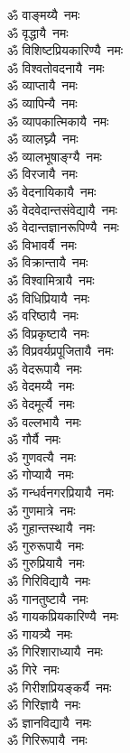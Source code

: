 \begin{flushleft}
\begin{multicols}{2}
ॐ वाङ्मय्यै~नमः\\
ॐ वृद्धायै~नमः\\
ॐ विशिष्टप्रियकारिण्यै~नमः\\
ॐ विश्वतोवदनायै~नमः\\
ॐ व्याप्तायै~नमः\\
ॐ व्यापिन्यै~नमः\\
ॐ व्यापकात्मिकायै~नमः\\
ॐ व्यालघ्न्यै~नमः\\
ॐ व्यालभूषाङ्ग्यै~नमः\\
ॐ विरजायै~नमः\hfill{}\\
ॐ वेदनायिकायै~नमः\\
ॐ वेदवेदान्तसंवेद्यायै~नमः\\
ॐ वेदान्तज्ञानरूपिण्यै~नमः\\
ॐ विभावर्यै~नमः\\
ॐ विक्रान्तायै~नमः\\
ॐ विश्वामित्रायै~नमः\\
ॐ विधिप्रियायै~नमः\\
ॐ वरिष्ठायै~नमः\\
ॐ विप्रकृष्टायै~नमः\\
ॐ विप्रवर्यप्रपूजितायै~नमः\hfill{}\\
ॐ वेदरूपायै~नमः\\
ॐ वेदमय्यै~नमः\\
ॐ वेदमूर्त्यै~नमः\\
ॐ वल्लभायै~नमः\\
ॐ गौर्यै~नमः\\
ॐ गुणवत्यै~नमः\\
ॐ गोप्यायै~नमः\\
ॐ गन्धर्वनगरप्रियायै~नमः\\
ॐ गुणमात्रे~नमः\\
ॐ गुहान्तस्थायै~नमः\hfill{}\\
ॐ गुरुरूपायै~नमः\\
ॐ गुरुप्रियायै~नमः\\
ॐ गिरिविद्यायै~नमः\\
ॐ गानतुष्टायै~नमः\\
ॐ गायकप्रियकारिण्यै~नमः\\
ॐ गायत्र्यै~नमः\\
ॐ गिरिशाराध्यायै~नमः\\
ॐ गिरे~नमः\\
ॐ गिरीशप्रियङ्कर्यै~नमः\\
ॐ गिरिज्ञायै~नमः\hfill{}\\
ॐ ज्ञानविद्यायै~नमः\\
ॐ गिरिरूपायै~नमः\\

\end{multicols}
\end{flushleft}
